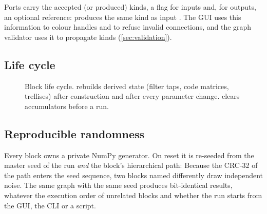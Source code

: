 Ports carry the accepted (or produced) kinds, a  flag for inputs and, for
outputs, an optional  reference:  produces the same kind
as input . The GUI uses this information to colour handles and to refuse invalid
connections, and the graph validator uses it to propagate kinds (\cref{sec:validation}).

\subsection{Life cycle}
\begin{figure}[htbp]
\centering
{}
\caption{Block life cycle.  rebuilds derived state (filter taps, code matrices,
trellises) after construction and after every parameter change.  clears
accumulators before a run.}
\label{fig:lifecycle}
\end{figure}

\subsection{Reproducible randomness}
Every block owns a private NumPy generator. On reset it is re-seeded from the master seed of
the run \emph{and} the block's hierarchical path:
Because the CRC-32 of the path enters the seed sequence, two  blocks named
differently draw independent noise. The same graph with the same seed produces bit-identical
results, whatever the execution order of unrelated blocks and whether the run starts from the
GUI, the CLI or a script.

